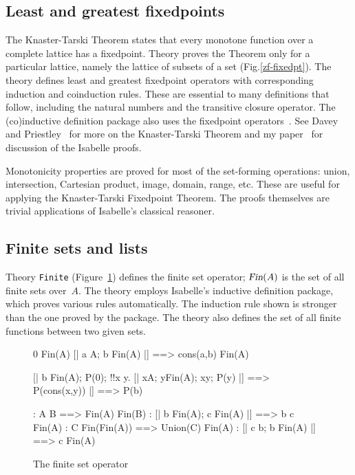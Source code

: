 \subsection{Least and greatest fixedpoints}

The Knaster-Tarski Theorem states that every monotone function over a
complete lattice has a fixedpoint.  Theory  proves the
Theorem only for a particular lattice, namely the lattice of subsets of a
set (Fig.\ts\ref{zf-fixedpt}).  The theory defines least and greatest
fixedpoint operators with corresponding induction and coinduction rules.
These are essential to many definitions that follow, including the natural
numbers and the transitive closure operator.  The (co)inductive definition
package also uses the fixedpoint operators~\cite{paulson-CADE}.  See
Davey and Priestley~\cite{davey-priestley} for more on the Knaster-Tarski
Theorem and my paper~\cite{paulson-set-II} for discussion of the Isabelle
proofs.

Monotonicity properties are proved for most of the set-forming operations:
union, intersection, Cartesian product, image, domain, range, etc.  These
are useful for applying the Knaster-Tarski Fixedpoint Theorem.  The proofs
themselves are trivial applications of Isabelle's classical reasoner. 


\subsection{Finite sets and lists}

Theory \texttt{Finite} (Figure~\ref{zf-fin}) defines the finite set operator;
$\emph{\sl Fin}(A)$ is the set of all finite sets over~$A$.  The theory employs
Isabelle's inductive definition package, which proves various rules
automatically.  The induction rule shown is stronger than the one proved by
the package.  The theory also defines the set of all finite functions
between two given sets.

\begin{figure}
\begin{alltt*}\isastyleminor
{}      0 \isasymin Fin(A)
       [| a \isasymin A;  b \isasymin Fin(A) |] ==> cons(a,b) \isasymin Fin(A)

    [| b \isasymin Fin(A);
       P(0);
       !!x y. [| x\isasymin{}A; y\isasymin{}Fin(A); x\isasymnotin{}y; P(y) |] ==> P(cons(x,y))
    |] ==> P(b)

:       A \isasymsubseteq B ==> Fin(A) \isasymsubseteq Fin(B)
:        [| b \isasymin Fin(A);  c \isasymin Fin(A) |] ==> b \isasymunion c \isasymin Fin(A)
:     C \isasymin Fin(Fin(A)) ==> Union(C) \isasymin Fin(A)
:     [| c \isasymsubseteq b;  b \isasymin Fin(A) |] ==> c \isasymin Fin(A)
\end{alltt*}
\caption{The finite set operator} \label{zf-fin}
\end{figure}

